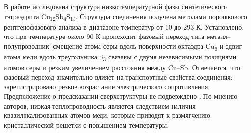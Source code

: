 В работе \cite{Nasonova2016} исследована структура низкотемпературной фазы синтетического тэтраэдрита Cu\textsubscript{12}Sb\textsubscript{4}S\textsubscript{13}. Структура соединения получена методами порошкового рентгенофазового анализа в диапазоне температур от 10 до 293 К. Установлено, что при температуре около 90 К происходит фазовый переход типа металл--полупроводник,  смещение атома серы вдоль поверхности октаэдра Cu\textsubscript{6} и сдвиг атома меди вдоль треугольника S\textsubscript{3} связаны с двумя независимыми позициями атомов серы и резким увеличением расстояния между Cu--Sb. Отмечается, что фазовый переход значительно влияет на транспортные свойства соединения: зарегистрировано резкое возрастание электрического сопротивления. Предположение о предсказании сверхструктуры не подверждено \cite{Tanaka2015}.
По мнению авторов, низкая теплопроводность является следствием наличия квазилокализованных атомов меди, которые приводят к размягчению кристаллической решетки с повышением температуры. 
